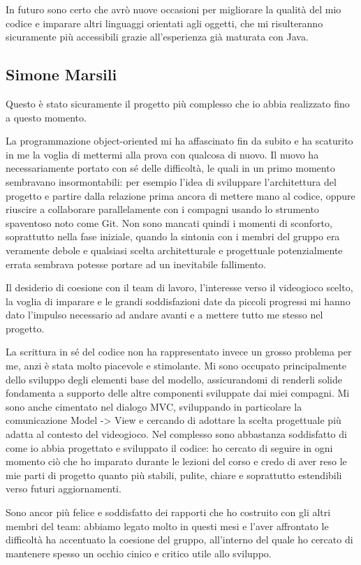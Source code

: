In futuro sono certo che avrò nuove occasioni per migliorare la qualità del mio codice e imparare altri linguaggi orientati agli oggetti, che mi risulteranno sicuramente più accessibili
grazie all'esperienza già maturata con Java.

\subsection{Simone Marsili}

Questo è stato sicuramente il progetto più complesso che io abbia realizzato fino a questo momento.

La programmazione object-oriented mi ha affascinato fin da subito e ha scaturito in me la voglia di mettermi alla prova con qualcosa di nuovo.
Il nuovo ha necessariamente portato con sé delle difficoltà, le quali in un primo momento sembravano insormontabili: per esempio l'idea di sviluppare l'architettura del progetto e partire dalla relazione
prima ancora di mettere mano al codice, oppure riuscire a collaborare parallelamente con i compagni usando lo strumento spaventoso noto come Git.
Non sono mancati quindi i momenti di sconforto, soprattutto nella fase iniziale, quando la sintonia con i membri del gruppo era veramente debole e qualsiasi scelta architetturale e progettuale potenzialmente errata
sembrava potesse portare ad un inevitabile fallimento.

Il desiderio di coesione con il team di lavoro, l'interesse verso il videogioco scelto, la voglia di imparare e le grandi soddisfazioni date da piccoli progressi mi hanno dato l'impulso necessario ad andare avanti e a
mettere tutto me stesso nel progetto.

La scrittura in sé del codice non ha rappresentato invece un grosso problema per me, anzi è stata molto piacevole e stimolante.
Mi sono occupato principalmente dello sviluppo degli elementi base del modello, assicurandomi di renderli solide fondamenta a supporto delle altre componenti sviluppate dai miei compagni.
Mi sono anche cimentato nel dialogo MVC, sviluppando in particolare la comunicazione Model -> View e cercando di adottare la scelta progettuale più adatta al contesto del videogioco.
Nel complesso sono abbastanza soddisfatto di come io abbia progettato e sviluppato il codice: ho cercato di seguire in ogni momento ciò che ho imparato durante le lezioni del corso e credo di aver reso le mie parti di progetto
quanto più stabili, pulite, chiare e soprattutto estendibili verso futuri aggiornamenti.

Sono ancor più felice e soddisfatto dei rapporti che ho costruito con gli altri membri del team: abbiamo legato molto in questi mesi e l'aver affrontato le difficoltà ha accentuato la coesione del gruppo,
all'interno del quale ho cercato di mantenere spesso un occhio cinico e critico utile allo sviluppo.

